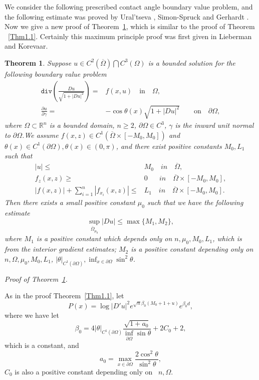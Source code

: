 \documentclass[11pt]{amsart}
\newtheorem{Thm}{Theorem}[section]
\numberwithin{equation}{section}
\begin{document}
 We consider the following prescribed contact angle boundary value problem, and the following estimate was proved by Ural'tseva \cite{Ur73}, Simon-Spruck \cite{SS76} and Gerhardt \cite{Ger76}. Now we give a new proof of Theorem~\ref{Thm5.1}, which is similar to the proof of Theorem ~\ref{Thm1.1}. Certainly this maximum principle proof was  first given in Lieberman \cite{Lieb88} and Korevaar\cite{Kor88}.

\begin{Thm}\label{Thm5.1}
Suppose $u\in C^{2}(\overline\Omega)\bigcap C^{3}(\Omega)$ is a bounded  solution for the following boundary value problem
\begin{align}
 \texttt{div} (\frac{Du}{\sqrt{1+|Du|^2}}) =&f(x, u)   \quad\text{in}\quad \Omega, \label{5.5}\\
             \frac{\partial u}{\partial \gamma}=&-\cos\theta(x) \sqrt{1+|Du|^2}  \qquad\text{on}\quad \partial \Omega,\label{5.6}
\end{align}
where $\Omega \subset \mathbb R^n $ is a bounded domain, $n\geq 2$, $\partial \Omega \in C^{3}$, $\gamma$ is the inward unit normal to $\partial\Omega $.We assume $f(x,z) \in C^{1}(\overline\Omega\times [-M_0, M_0])$ and $\theta(x)\in C^1(\partial\Omega), \theta(x)\in (0, \pi)$,
and there exist positive constants $M_0, L_1$ such that
\begin{align*}
|u|\leq& M_0\quad in\quad\overline\Omega,\\
f_z(x,z)\geq &0 \,\,\,\,\quad in\quad \overline\Omega\times[-M_0, M_0],\\
|f(x,z)|+\sum_{i=1}^n|f_{x_i}(x,z)|\leq & L_1 \quad in\quad \overline\Omega\times[-M_0, M_0].
\end{align*}
Then there exists a small positive constant
$\mu_0$ such that we have the following estimate
$$\sup_{\overline\Omega_{\mu_0}}|Du|\leq \max\{M_1, M_2\},$$
where $M_1$ is a positive constant which depends only on $n, \mu_0, M_0, L_1$, which is from the interior gradient estimates;
$M_2$ is  a positive constant depending only on $n, \Omega, \mu_0, M_0, L_1$,
$|\theta|_{C^1(\partial\Omega)}, \inf_{x\in\partial\Omega}\sin^2\theta$.
\end{Thm}





{\em Proof of  Theorem~\ref{Thm5.1}.}

As in the proof Theorem~\ref{Thm1.1}, let
$$P(x)=\log|D'u|^2e^{\sqrt{n}\beta_0(M_0+1+u)}e^{\beta_0d},$$ where we  have let
$$\beta_0=4|\theta|_{C^1(\partial\Omega)}\frac{\sqrt{1+a_0}}{\inf_{\partial\Omega}\sin\theta}+2C_0+2, $$ which is a constant, and $$a_0=\max_{x\in\partial\Omega}\frac{2\cos^2\theta}{\sin^2\theta},$$ $C_0$ is also a positive constant depending only on ~$n,\Omega$.
\end{document}
